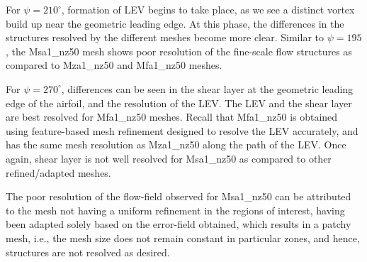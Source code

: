 



For $\psi=210^\circ$, formation of LEV begins to take place, as we see a distinct vortex build up near the geometric leading edge. 
At this phase, the differences in the structures resolved by the different meshes become more clear.
Similar to $\psi=195$, the Msa1\_nz50 mesh shows poor resolution of the fine-scale flow structures as compared to  Mza1\_nz50 and Mfa1\_nz50 meshes.

For $\psi=270^\circ$, differences can be seen in the shear layer at the geometric leading edge of the airfoil, and the resolution of the LEV. 
The LEV and the shear layer are best resolved for Mfa1\_nz50 meshes. 
Recall that Mfa1\_nz50 is obtained using feature-based mesh refinement designed to resolve the LEV accurately, and has the same mesh resolution as Mza1\_nz50 along the path of the LEV. 
Once again, shear layer is not well resolved for Msa1\_nz50 as compared to other refined/adapted meshes.

The poor resolution of the flow-field observed for Msa1\_nz50 can be attributed to the mesh not having a uniform refinement in the regions of interest, having been adapted solely based on the error-field obtained, which results in a patchy mesh, i.e., the mesh size does not remain constant in particular zones, and hence, structures are not resolved as desired.

